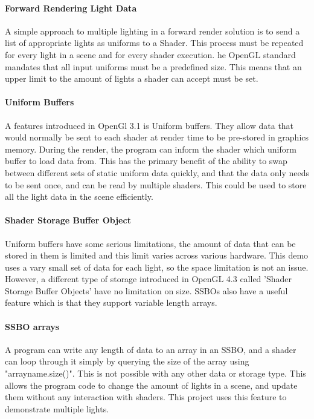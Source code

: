 \documentclass[conference]{acmsiggraph}
\begin{document}
\paragraph{Forward Rendering Light Data}
A simple approach to multiple lighting in a forward render solution is to send a list of appropriate lights as uniforms to a Shader.
This process must be repeated for every light in a scene and for every shader execution.  he OpenGL standard mandates that all input uniforms must be a predefined size. This means that an upper limit to the amount of lights a shader can accept must be set.

\paragraph{Uniform Buffers}
A features introduced in OpenGl 3.1 is Uniform buffers. They allow data that would normally be sent to each shader at render time to be pre-stored in graphics memory. During the render, the program can inform the shader which uniform buffer to load data from. This has the primary benefit of the ability to swap between different sets of static uniform data quickly, and that the data only needs to be sent once, and can be read by multiple shaders. This could be used to store all the light data in the scene efficiently.

\paragraph{Shader Storage Buffer Object}
Uniform buffers have some serious limitations, the amount of data that can be stored in them is limited and this limit varies across various hardware. This demo uses a vary small set of data for each light, so the space limitation is not an issue. However, a different type of storage introduced in OpenGL 4.3 called 'Shader Storage Buffer Objects' have no limitation on size. SSBOs also have a useful feature which is that they support variable length arrays.

\paragraph{SSBO arrays}
A program can write any length of data to an array in an SSBO, and a shader can loop through it simply by querying the size of the array using "arrayname.size()". This is not possible with any other data or storage type. This allows the program code to change the amount of lights in a scene, and update them without any interaction with shaders. This project uses this feature to demonstrate multiple lights.
\end{document}
